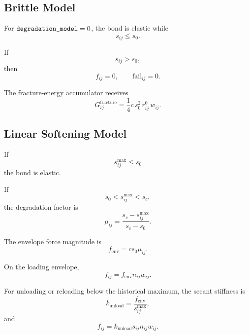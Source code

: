 \documentclass[11pt]{article}
\newcommand{\code}[1]{\texttt{\detokenize{#1}}}
\begin{document}
\subsection{Brittle Model}

For \(\code{degradation_model}=0\), the bond is elastic while
\begin{equation}
    s_{ij} \le s_0 .
\end{equation}

If
\begin{equation}
    s_{ij} > s_0,
\end{equation}
then
\begin{equation}
    f_{ij}=0,
    \qquad
    \mathrm{fail}_{ij}=0 .
\end{equation}

The fracture-energy accumulator receives
\begin{equation}
    G_{ij}^{\mathrm{fracture}}
    =
    \frac{1}{4}
    c\,s_0^2\,r_{ij}^0\,w_{ij}.
\end{equation}

\subsection{Linear Softening Model}

If
\begin{equation}
    s_{ij}^{\max} \le s_0
\end{equation}
the bond is elastic.

If
\begin{equation}
    s_0 < s_{ij}^{\max} < s_c,
\end{equation}
the degradation factor is
\begin{equation}
    \mu_{ij}
    =
    \frac{s_c-s_{ij}^{\max}}{s_c-s_0}.
\end{equation}

The envelope force magnitude is
\begin{equation}
    f_{\mathrm{env}}
    =
    cs_0\mu_{ij}.
\end{equation}

On the loading envelope,
\begin{equation}
    f_{ij}
    =
    f_{\mathrm{env}}n_{ij}w_{ij}.
\end{equation}

For unloading or reloading below the historical maximum, the secant stiffness is
\begin{equation}
    k_{\mathrm{unload}}
    =
    \frac{f_{\mathrm{env}}}{s_{ij}^{\max}},
\end{equation}
and
\begin{equation}
    f_{ij}
    =
    k_{\mathrm{unload}}s_{ij}n_{ij}w_{ij}.
\end{equation}
\end{document}

